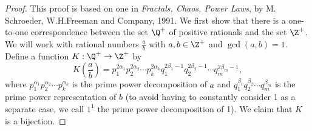 \begin{proof} This proof is based on one in \emph{Fractals, Chaos, Power Laws}, by M. Schroeder, W.H.Freeman and Company, 1991. We first show that there is a one-to-one correspondence between the set $\Q^+$ of positive rationals and the set $\Z^+$. We will work with rational numbers $\frac{a}{b}$ with $a,b \in \Z^+$ and $\gcd(a,b)=1$. Define a function $K : \Q^+ \to \Z^+$ by 
\[K \left( \frac{a}{b} \right) = p_1^{2\alpha_1} p_2^{2\alpha_2} \cdots p_k^{2\alpha_k} q_1^{2\beta_1-1} q_2^{2\beta_2-1} \cdots q_m^{2\beta_m-1},\]
where $p_1^{\alpha_1} p_2^{\alpha_2} \cdots p_k^{\alpha_k}$ is the prime power decomposition of $a$ and $q_1^{\beta_1} q_2^{\beta_2} \cdots q_m^{\beta_m}$ is the prime power representation of $b$ (to avoid having to constantly consider 1 as a separate case, we call $1^1$ the prime power decomposition of 1). We claim that $K$ is a bijection. 


\end{proof}
